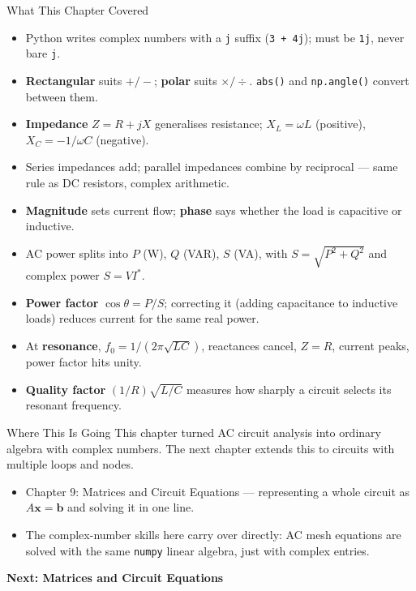 \documentclass[9pt,aspectratio=169,xcolor=table]{beamer}
\begin{document}
\begin{frame}{What This Chapter Covered}
    \leavevmode
    \small
    \begin{itemize}
        \item Python writes complex numbers with a \texttt{j} suffix
              (\texttt{3 + 4j}); must be \texttt{1j}, never bare
              \texttt{j}.
        \item \textbf{Rectangular} suits $+/-$; \textbf{polar} suits
              $\times/\div$. \texttt{abs()} and \texttt{np.angle()}
              convert between them.
        \item \textbf{Impedance} $Z = R + jX$ generalises resistance;
              $X_L = \omega L$ (positive), $X_C = -1/\omega C$
              (negative).
        \item Series impedances \alert{add}; parallel impedances
              combine by \alert{reciprocal} --- same rule as DC
              resistors, complex arithmetic.
        \item \textbf{Magnitude} sets current flow; \textbf{phase}
              says whether the load is capacitive or inductive.
        \item AC power splits into $P$ (W), $Q$ (VAR), $S$ (VA), with
              $S = \sqrt{P^2+Q^2}$ and complex power $S = VI^{*}$.
        \item \textbf{Power factor} $\cos\theta = P/S$; correcting it
              (adding capacitance to inductive loads) reduces current
              for the same real power.
        \item At \textbf{resonance}, $f_0 = 1/(2\pi\sqrt{LC})$,
              reactances cancel, $Z=R$, current peaks, power factor
              hits unity.
        \item \textbf{Quality factor} $(1/R)\sqrt{L/C}$ measures how
              sharply a circuit selects its resonant frequency.
    \end{itemize}
\end{frame}

\begin{frame}{Where This Is Going}
    \leavevmode
    \small
    This chapter turned AC circuit analysis into ordinary algebra with
    complex numbers. The next chapter extends this to circuits with
    \alert{multiple} loops and nodes.

    \vspace{3mm}
    \begin{itemize}
        \item Chapter 9: Matrices and Circuit Equations ---
              representing a whole circuit as $A\mathbf{x} = \mathbf{b}$
              and solving it in one line.
        \item The complex-number skills here carry over directly: AC
              mesh equations are solved with the same \texttt{numpy}
              linear algebra, just with complex entries.
    \end{itemize}

    \vspace{4mm}
    \begin{center}
        \large\color{primary}\textbf{Next: Matrices and Circuit Equations}
    \end{center}
\end{frame}
\end{document}
